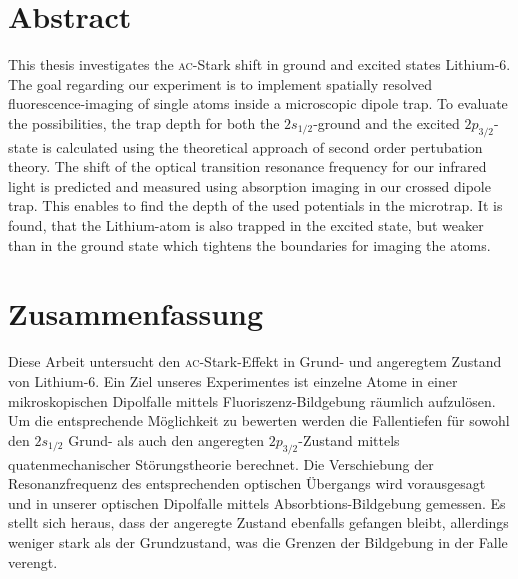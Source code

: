 \section*{Abstract}

This thesis investigates the \textsc{ac}-Stark shift in ground and excited states Lithium-6. 
The goal regarding our experiment is to implement spatially resolved fluorescence-imaging of single atoms inside a microscopic dipole trap. To evaluate the possibilities, the trap depth for both the $2s_{1/2}$-ground and the excited $2p_{3/2}$-state is calculated using the theoretical approach of second order pertubation theory. The shift of the optical transition resonance frequency for our infrared light is predicted and measured using absorption imaging in our crossed dipole trap. This enables to find the depth of the used potentials in the microtrap. It is found, that the Lithium-atom is also trapped in the excited state, but weaker than in the ground state which tightens the boundaries for imaging the atoms.

\section*{Zusammenfassung}

Diese Arbeit untersucht den \textsc{ac}-Stark-Effekt in Grund- und angeregtem Zustand von Lithium-6. Ein Ziel unseres Experimentes ist einzelne Atome in einer mikroskopischen Dipolfalle mittels Fluoriszenz-Bildgebung räumlich aufzulösen. Um die entsprechende Möglichkeit zu bewerten werden die Fallentiefen für sowohl den $2s_{1/2}$ Grund- als auch den angeregten $2p_{3/2}$-Zustand mittels quatenmechanischer Störungstheorie berechnet. Die Verschiebung der Resonanzfrequenz des entsprechenden optischen Übergangs wird vorausgesagt und in unserer optischen Dipolfalle mittels Absorbtions-Bildgebung gemessen. Es stellt sich heraus, dass der angeregte Zustand ebenfalls gefangen bleibt, allerdings weniger stark als der Grundzustand, was die Grenzen der Bildgebung in der Falle verengt.